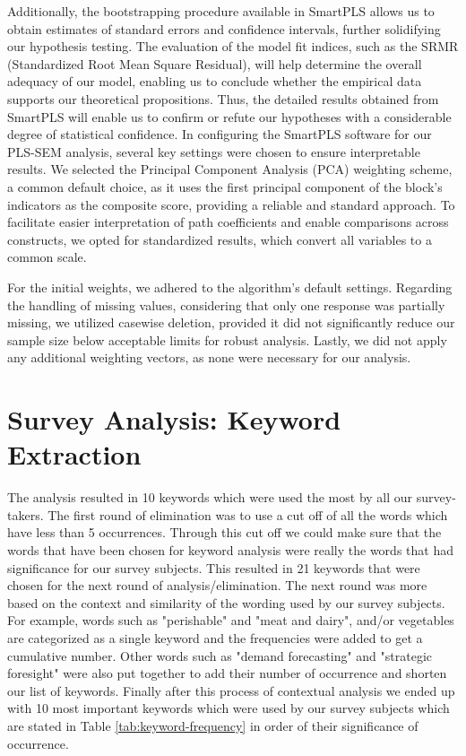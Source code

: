 Additionally, the bootstrapping procedure available in SmartPLS allows us to obtain estimates of standard errors and confidence intervals, further solidifying our hypothesis testing. The evaluation of the model fit indices, such as the SRMR (Standardized Root Mean Square Residual), will help determine the overall adequacy of our model, enabling us to conclude whether the empirical data supports our theoretical propositions. Thus, the detailed results obtained from SmartPLS will enable us to confirm or refute our hypotheses with a considerable degree of statistical confidence. In configuring the SmartPLS software for our PLS-SEM analysis, several key settings were chosen to ensure interpretable results. We selected the Principal Component Analysis (PCA) weighting scheme, a common default choice, as it uses the first principal component of the block’s indicators as the composite score, providing a reliable and standard approach. To facilitate easier interpretation of path coefficients and enable comparisons across constructs, we opted for standardized results, which convert all variables to a common scale. 

For the initial weights, we adhered to the algorithm’s default settings. Regarding the handling of missing values, considering that only one response was partially missing, we utilized casewise deletion, provided it did not significantly reduce our sample size below acceptable limits for robust analysis. Lastly, we did not apply any additional weighting vectors, as none were necessary for our analysis.

\section{Survey Analysis: Keyword Extraction}
\label{sec:keyword-analysis}

The analysis resulted in 10 keywords which were used the most by all our survey-takers. The first round of elimination was to use a cut off of all the words which have less than 5 occurrences. Through this cut off we could make sure that the words that have been chosen for keyword analysis were really the words that had significance for our survey subjects. This resulted in 21 keywords that were chosen for the next round of analysis/elimination. The next round was more based on the context and similarity of the wording used by our survey subjects. For example, words such as "perishable" and "meat and dairy", and/or vegetables are categorized as a single keyword and the frequencies were added to get a cumulative number. Other words such as "demand forecasting" and "strategic foresight" were also put together to add their number of occurrence and shorten our list of keywords. Finally after this process of contextual analysis we ended up with 10 most important keywords which were used by our survey subjects which are stated in Table \ref{tab:keyword-frequency} in order of their significance of occurrence.

